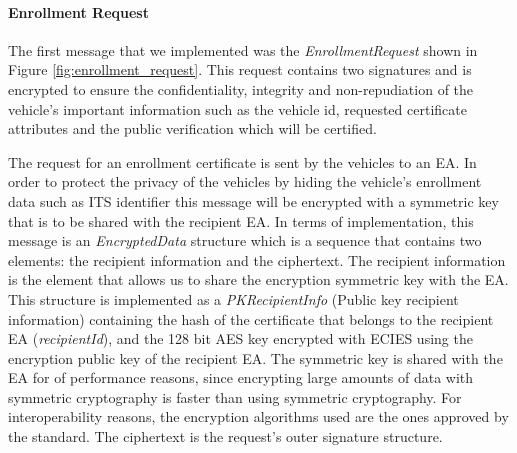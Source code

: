 \paragraph{Enrollment Request}
The first message that we implemented was the \textit{EnrollmentRequest} shown in Figure \ref{fig:enrollment_request}. This request contains two signatures and is encrypted to ensure the confidentiality, integrity and non-repudiation of the vehicle's important information such as the vehicle id, requested certificate attributes and the public verification which will be certified.

The request for an enrollment certificate is sent by the vehicles to an EA. In order to protect the privacy of the vehicles by hiding the vehicle's enrollment data such as ITS identifier this message will be encrypted with a symmetric key that is to be shared with the recipient EA. In terms of implementation, this message is an \textit{EncryptedData} structure which is a sequence that contains two elements: the recipient information and the ciphertext. The recipient information is the element that allows us to share the encryption symmetric key with the EA. This structure is implemented as a \textit{PKRecipientInfo} (Public key recipient information) containing the hash of the certificate that belongs to the recipient EA (\textit{recipientId}), and the 128 bit AES key encrypted with ECIES using the encryption public key of the recipient EA. The symmetric key is shared with the EA for of performance reasons, since encrypting large amounts of data with symmetric cryptography is faster than using symmetric cryptography. For interoperability reasons, the encryption algorithms used are the ones approved by the standard. The ciphertext is the request's outer signature structure.

